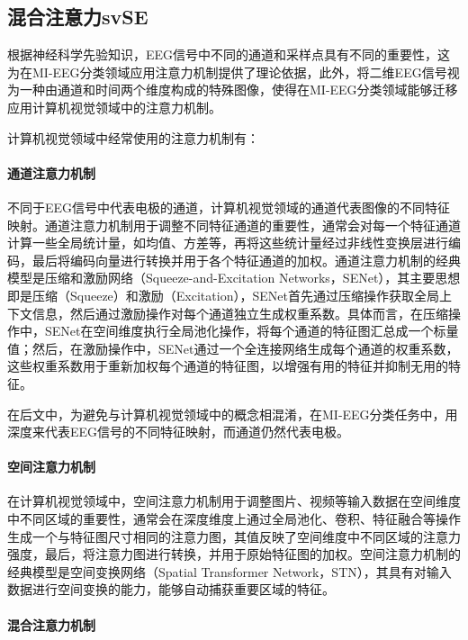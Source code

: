 \subsection{混合注意力svSE}

根据神经科学先验知识，EEG信号中不同的通道和采样点具有不同的重要性，这为在MI-EEG分类领域应用注意力机制提供了理论依据，此外，将二维EEG信号视为一种由通道和时间两个维度构成的特殊图像，使得在MI-EEG分类领域能够迁移应用计算机视觉领域中的注意力机制。

计算机视觉领域中经常使用的注意力机制有：

\paragraph{通道注意力机制}
    
不同于EEG信号中代表电极的通道，计算机视觉领域的通道代表图像的不同特征映射。通道注意力机制用于调整不同特征通道的重要性，通常会对每一个特征通道计算一些全局统计量，如均值、方差等，再将这些统计量经过非线性变换层进行编码，最后将编码向量进行转换并用于各个特征通道的加权。通道注意力机制的经典模型是压缩和激励网络（Squeeze-and-Excitation Networks，SENet）\cite{8578843}，其主要思想即是压缩（Squeeze）和激励（Excitation），SENet首先通过压缩操作获取全局上下文信息，然后通过激励操作对每个通道独立生成权重系数。具体而言，在压缩操作中，SENet在空间维度执行全局池化操作，将每个通道的特征图汇总成一个标量值；然后，在激励操作中，SENet通过一个全连接网络生成每个通道的权重系数，这些权重系数用于重新加权每个通道的特征图，以增强有用的特征并抑制无用的特征。

在后文中，为避免与计算机视觉领域中的概念相混淆，在MI-EEG分类任务中，用深度来代表EEG信号的不同特征映射，而通道仍然代表电极。

\paragraph{空间注意力机制}
    
在计算机视觉领域中，空间注意力机制用于调整图片、视频等输入数据在空间维度中不同区域的重要性，通常会在深度维度上通过全局池化、卷积、特征融合等操作生成一个与特征图尺寸相同的注意力图，其值反映了空间维度中不同区域的注意力强度，最后，将注意力图进行转换，并用于原始特征图的加权。空间注意力机制的经典模型是空间变换网络（Spatial Transformer Network，STN）\cite{jaderberg2015spatial}，其具有对输入数据进行空间变换的能力，能够自动捕获重要区域的特征。

\paragraph{混合注意力机制}
    

